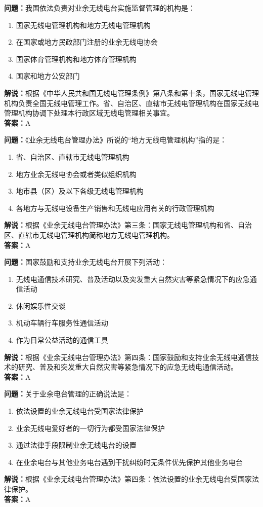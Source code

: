 \documentclass[UTF8]{ctexbook}
\begin{document}
\textbf{问题：}我国依法负责对业余无线电台实施监督管理的机构是：
\begin{enumerate}[label=\Alph*), leftmargin=3em]
  \item 国家无线电管理机构和地方无线电管理机构
  \item 在国家或地方民政部门注册的业余无线电协会
  \item 国家体育管理机构和地方体育管理机构
  \item 国家和地方公安部门
\end{enumerate}
\textbf{解说：}根据《中华人民共和国无线电管理条例》第八条和第十条，国家无线电管理机构负责全国无线电管理工作。省、自治区、直辖市无线电管理机构在国家无线电管理机构协调下处理本行政区域无线电管理相关事宜。\\
\textbf{答案：}A

\textbf{问题：}《业余无线电台管理办法》所说的“地方无线电管理机构”指的是：
\begin{enumerate}[label=\Alph*), leftmargin=3em]
  \item 省、自治区、直辖市无线电管理机构
  \item 地方业余无线电协会或者类似组织机构
  \item 地市县（区）及以下各级无线电管理机构
  \item 各地方与无线电设备生产销售和无线电应用有关的行政管理机构
\end{enumerate}
\textbf{解说：}根据《业余无线电台管理办法》第三条：国家无线电管理机构和省、自治区、直辖市无线电管理机构简称地方无线电管理机构。\\
\textbf{答案：}A

\textbf{问题：}国家鼓励和支持业余无线电台开展下列活动：
\begin{enumerate}[label=\Alph*), leftmargin=3em]
  \item 无线电通信技术研究、普及活动以及突发重大自然灾害等紧急情况下的应急通信活动
  \item 休闲娱乐性交谈
  \item 机动车辆行车服务性通信活动
  \item 作为日常公益活动的通信工具
\end{enumerate}
\textbf{解说：}根据《业余无线电台管理办法》第四条：国家鼓励和支持业余无线电通信技术的研究、普及和突发重大自然灾害等紧急情况下的应急无线电通信活动。\\
\textbf{答案：}A

\textbf{问题：}关于业余电台管理的正确说法是：
\begin{enumerate}[label=\Alph*), leftmargin=3em]
  \item 依法设置的业余无线电台受国家法律保护
  \item 业余无线电爱好者的一切行为都受国家法律保护
  \item 通过法律手段限制业余无线电台的设置
  \item 在业余电台与其他业务电台遇到干扰纠纷时无条件优先保护其他业务电台
\end{enumerate}
\textbf{解说：}根据《业余无线电台管理办法》第四条：依法设置的业余无线电台受国家法律保护。\\
\textbf{答案：}A
\end{document}
